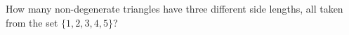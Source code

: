 How many non-degenerate triangles have three different side lengths, all taken from the set $\{1,2,3,4,5\}$?

